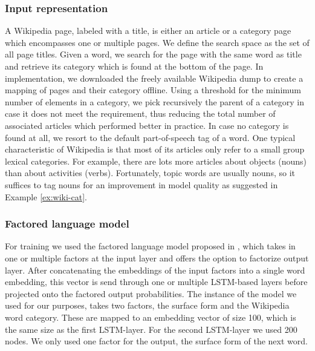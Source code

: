 \documentclass[a4paper]{article}
\begin{document}
\subsubsection{Input representation}
A Wikipedia page, labeled with a title, is either an article or a category page which encompasses one or multiple pages.
We define the search space as the set of all page titles. Given a word, we search for the page with the same word as title and retrieve its category which is found at the bottom of the page.
In implementation, we downloaded the freely available Wikipedia dump to create a mapping of pages and their category offline. Using a threshold for the minimum number of elements in a category, we pick recursively the parent of a category in case it does not meet the requirement, thus reducing the total number of associated articles which performed better in practice. In case no category is found at all, we resort to the default part-of-speech tag of a word.
One typical characteristic of Wikipedia is that most of its articles only refer to a small group lexical categories. For example, there are lots more articles about objects (nouns) than about activities (verbs). Fortunately, topic words are usually nouns, so it suffices to tag nouns for an improvement in model quality as suggested in  Example \ref{ex:wiki-cat}.

\subsubsection{Factored language model}
For training we used the factored language model proposed in \cite{niehuesusing}, which takes in one or multiple factors at the input layer and offers the option to factorize output layer. After concatenating the embeddings of the input factors into a single word embedding, this vector is send through one or multiple LSTM-based layers before projected onto the factored output probabilities. The instance of the model we used for our purposes, takes two factors, the surface form and the Wikipedia word category. These are mapped to an embedding vector of size 100, which is the same size as the first LSTM-layer. For the second LSTM-layer we used 200 nodes. We only used one factor for the output, the surface form of the next word.
\end{document}

